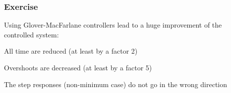\subsubsection{Exercise} 

Using Glover-MacFarlane controllers lead to a huge improvement of the controlled system:
\begin{shortitemize}
    \item All time are reduced (at least by a factor 2)
    \item Overshoots are decreased (at least by a factor 5)
    \item The step responses (non-minimum case) do not go in the wrong direction
\end{shortitemize}
